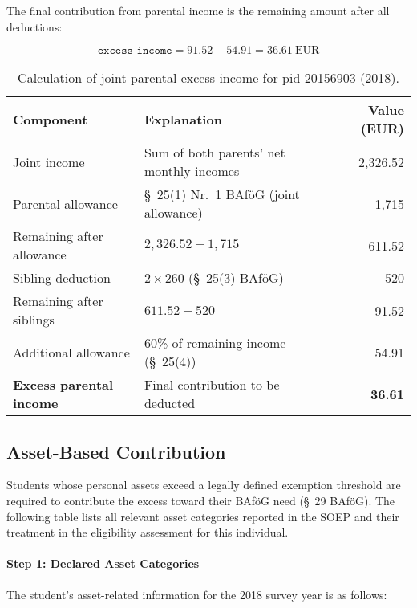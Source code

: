 The final contribution from parental income is the remaining amount after all deductions:

\[
\texttt{excess\_income} = 91.52 - 54.91 = 36.61~\text{EUR}
\]

\begin{table}[H]
\scriptsize
\centering
\begin{tabular}{llr}
\toprule
\textbf{Component} & \textbf{Explanation} & \textbf{Value (EUR)} \\
\midrule
Joint income & Sum of both parents’ net monthly incomes & 2,326.52 \\
Parental allowance & §~25(1) Nr.~1 BAföG (joint allowance) & 1,715 \\
Remaining after allowance & $2{,}326.52 - 1{,}715$ & 611.52 \\
Sibling deduction & $2 \times 260$ (§~25(3) BAföG) & 520 \\
Remaining after siblings & $611.52 - 520$ & 91.52 \\
Additional allowance & 60\% of remaining income (§~25(4)) & 54.91 \\
\textbf{Excess parental income} & Final contribution to be deducted & \textbf{36.61} \\
\bottomrule
\end{tabular}
\caption{Calculation of joint parental excess income for pid 20156903 (2018).}
\label{table:bafoeg_joint_income}
\end{table}


\subsection{Asset-Based Contribution}

Students whose personal assets exceed a legally defined exemption threshold are required to contribute the excess toward their BAföG need (§~29 BAföG). The following table lists all relevant asset categories reported in the SOEP and their treatment in the eligibility assessment for this individual.

\paragraph{Step 1: Declared Asset Categories}

The student’s asset-related information for the 2018 survey year is as follows:

